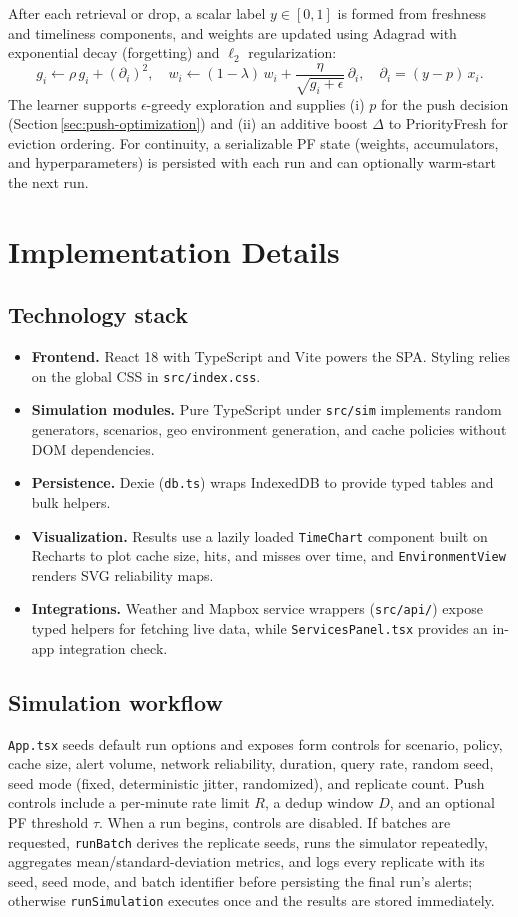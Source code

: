 After each retrieval or drop, a scalar label $y \in [0,1]$ is formed from freshness and timeliness components, and weights are updated using Adagrad with exponential decay (forgetting) and $\ell_2$ regularization:
$$
g_i \leftarrow \rho\,g_i + (\partial_i)^2,\quad
w_i \leftarrow (1-\lambda)\,w_i + \frac{\eta}{\sqrt{g_i+\epsilon}}\,\partial_i,\quad \partial_i=(y-p)\,x_i.
$$
The learner supports $\epsilon$-greedy exploration and supplies (i) $p$ for the push decision (Section\,\ref{sec:push-optimization}) and (ii) an additive boost $\Delta$ to PriorityFresh for eviction ordering. For continuity, a serializable PF state (weights, accumulators, and hyperparameters) is persisted with each run and can optionally warm-start the next run.

\section{Implementation Details}
\subsection{Technology stack}
\begin{itemize}
    \item \textbf{Frontend.} React 18 with TypeScript and Vite powers the SPA. Styling relies on the global CSS in \texttt{src/index.css}.
    \item \textbf{Simulation modules.} Pure TypeScript under \texttt{src/sim} implements random generators, scenarios, geo environment generation, and cache policies without DOM dependencies.
    \item \textbf{Persistence.} Dexie (\texttt{db.ts}) wraps IndexedDB to provide typed tables and bulk helpers.
    \item \textbf{Visualization.} Results use a lazily loaded \texttt{TimeChart} component built on Recharts to plot cache size, hits, and misses over time, and \texttt{EnvironmentView} renders SVG reliability maps.
    \item \textbf{Integrations.} Weather and Mapbox service wrappers (\texttt{src/api/}) expose typed helpers for fetching live data, while \texttt{ServicesPanel.tsx} provides an in-app integration check.
\end{itemize}

\subsection{Simulation workflow}
\texttt{App.tsx} seeds default run options and exposes form controls for scenario, policy, cache size, alert volume, network reliability, duration, query rate, random seed, seed mode (fixed, deterministic jitter, randomized), and replicate count. Push controls include a per-minute rate limit $R$, a dedup window $D$, and an optional PF threshold $\tau$. When a run begins, controls are disabled. If batches are requested, \texttt{runBatch} derives the replicate seeds, runs the simulator repeatedly, aggregates mean/standard-deviation metrics, and logs every replicate with its seed, seed mode, and batch identifier before persisting the final run's alerts; otherwise \texttt{runSimulation} executes once and the results are stored immediately.

